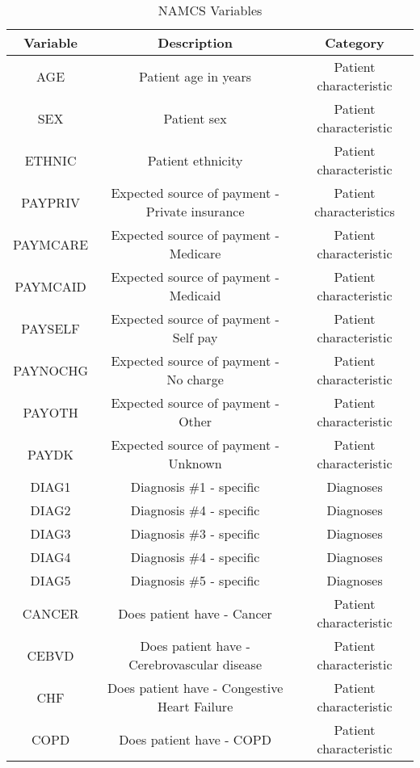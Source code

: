 \documentclass[11pt]{SelfArxOneColBMN}
\begin{document}
\begin{table*}[t]
  \centering
  \caption{NAMCS Variables} %
  \begin{tabular}{|c|c|c|}
  \hline
  Variable & Description & Category\\
  \hline
    AGE & Patient age in years & Patient characteristic\\
    SEX & Patient sex & Patient characteristic\\
    ETHNIC & Patient ethnicity & Patient characteristic\\
    PAYPRIV & Expected source of payment - Private insurance & Patient characteristics\\
    PAYMCARE & Expected source of payment - Medicare & Patient characteristic\\
    PAYMCAID & Expected source of payment - Medicaid & Patient characteristic\\
    PAYSELF & Expected source of payment - Self pay & Patient characteristic\\
    PAYNOCHG & Expected source of payment - No charge & Patient characteristic\\
    PAYOTH & Expected source of payment - Other & Patient characteristic\\
    PAYDK & Expected source of payment - Unknown & Patient characteristic\\
    DIAG1 & Diagnosis \#1 - specific & Diagnoses\\
    DIAG2 & Diagnosis \#4 - specific & Diagnoses\\
    DIAG3 & Diagnosis \#3 - specific & Diagnoses\\
    DIAG4 & Diagnosis \#4 - specific & Diagnoses\\
    DIAG5 & Diagnosis \#5 - specific & Diagnoses\\
    CANCER & Does patient have - Cancer & Patient characteristic\\
    CEBVD & Does patient have - Cerebrovascular disease & Patient characteristic\\
    CHF & Does patient have - Congestive Heart Failure & Patient characteristic\\
    COPD & Does patient have - COPD & Patient characteristic\\

\end{tabular}
\end{table*}
\end{document}
